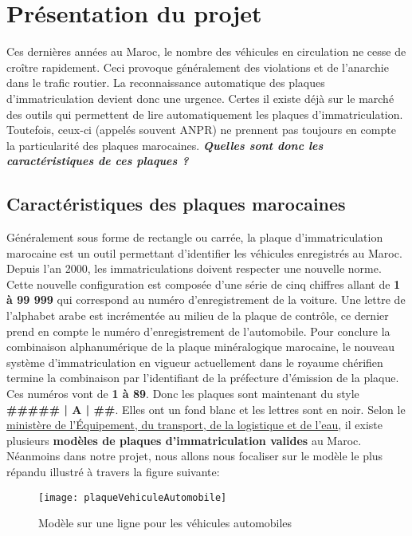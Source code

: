 \section{Présentation du projet}
Ces dernières années au Maroc, le nombre des véhicules en circulation ne cesse de croître rapidement. Ceci provoque généralement des violations et de l'anarchie dans le trafic routier. La reconnaissance automatique des plaques d’immatriculation devient donc une urgence. Certes il existe déjà sur le marché des outils qui permettent de lire automatiquement les plaques d’immatriculation. Toutefois, ceux-ci (appelés souvent ANPR) ne prennent pas toujours en compte la particularité des plaques marocaines. \textbf{\textit{Quelles sont donc les caractéristiques de ces plaques ?}}

    \subsection{Caractéristiques des plaques marocaines}
    Généralement sous forme de rectangle ou carrée, la plaque d’immatriculation marocaine est un outil permettant d’identifier les véhicules enregistrés au Maroc. Depuis l’an 2000, les immatriculations doivent respecter une nouvelle norme. Cette nouvelle configuration est composée d’une série de cinq chiffres allant de \textbf{1 à 99 999} qui correspond au numéro d’enregistrement de la voiture. Une lettre de l’alphabet arabe est incrémentée au milieu de la plaque de contrôle, ce dernier prend en compte le numéro d’enregistrement de l’automobile. Pour conclure la combinaison alphanumérique de la plaque minéralogique marocaine, le nouveau système d’immatriculation en vigueur actuellement dans le royaume chérifien termine la combinaison par l’identifiant de la préfecture d’émission de la plaque. Ces numéros vont de \textbf{1 à 89}. Donc les plaques sont maintenant du style \textbf{\#\#\#\#\# | A | \#\#}. Elles ont un fond blanc et les lettres sont en noir. Selon le \href{http://www.equipement.gov.ma/Transport-routier/Carte-grise/Pages/Differents-modeles-de-plaques-d-immatriculation-.aspx}{ministère de l'Équipement, du transport, de la logistique et de l'eau}, il existe plusieurs \textbf{modèles de plaques d'immatriculation valides} au Maroc. Néanmoins dans notre projet, nous allons nous focaliser sur le modèle le plus répandu illustré à travers la figure suivante:
        \begin{figure}[H]
            \centering
            \texttt{[image: plaqueVehiculeAutomobile]}
            \caption{Modèle sur une ligne pour les véhicules automobiles}
        \end{figure}
